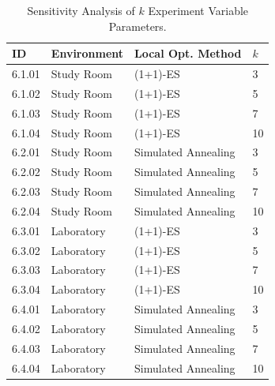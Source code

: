 \begin{table}[ht]
\centering
\caption{Sensitivity Analysis of $k$ Experiment Variable Parameters.}
\label{tab:k_sensitivity_params}
\begin{tabular}{@{}llll@{}}
\hline
    ID & Environment & Local Opt. Method & $k$ \\
\hline
    6.1.01 & Study Room & (1+1)-ES & 3 \\
    6.1.02 & Study Room & (1+1)-ES & 5 \\
    6.1.03 & Study Room & (1+1)-ES & 7 \\
    6.1.04 & Study Room & (1+1)-ES & 10 \\
    \noalign{\smallskip}
    6.2.01 & Study Room & Simulated Annealing & 3 \\
    6.2.02 & Study Room & Simulated Annealing & 5 \\
    6.2.03 & Study Room & Simulated Annealing & 7 \\
    6.2.04 & Study Room & Simulated Annealing & 10 \\
    \noalign{\smallskip}
    6.3.01 & Laboratory & (1+1)-ES & 3 \\
    6.3.02 & Laboratory & (1+1)-ES & 5 \\
    6.3.03 & Laboratory & (1+1)-ES & 7 \\
    6.3.04 & Laboratory & (1+1)-ES & 10 \\
    \noalign{\smallskip}
    6.4.01 & Laboratory & Simulated Annealing & 3 \\
    6.4.02 & Laboratory & Simulated Annealing & 5 \\
    6.4.03 & Laboratory & Simulated Annealing & 7 \\
    6.4.04 & Laboratory & Simulated Annealing & 10 \\
\hline
\end{tabular}
\end{table}